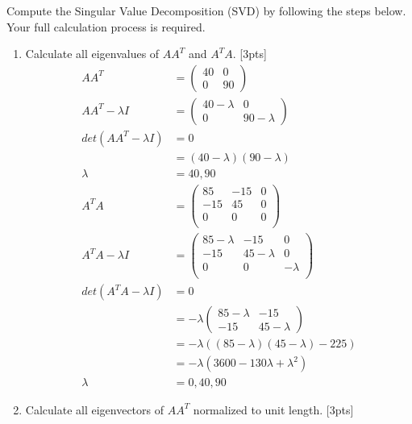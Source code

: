 \documentclass{article}
\begin{document}
\noindent Compute the Singular Value Decomposition (SVD) by following the steps below. Your full calculation process is required.
\begin{enumerate}[label=(\alph*)]
\item Calculate all eigenvalues of $AA^{T}$ and $A^{T}A$. [3pts] \newline \begin{align*}
    AA^T &= \begin{pmatrix}
        40 & 0 \\
        0 & 90
    \end{pmatrix} \\ AA^T-\lambda I&=\begin{pmatrix}
        40-\lambda & 0 \\
        0 & 90 - \lambda
    \end{pmatrix} \\
    det(AA^T-\lambda I)&=0\\ &=(40-\lambda)(90-\lambda) \\
    \lambda &= 40, 90 \\
    A^TA &= \begin{pmatrix}
        85  & -15  &   0 \\
        -15  &  45   &  0 \\
        0   &  0  &   0  \\
    \end{pmatrix} \\ A^TA-\lambda I&=\begin{pmatrix}
        85-\lambda  & -15  &   0 \\
        -15  &  45-\lambda   &  0 \\
        0   &  0  &   -\lambda  \\
    \end{pmatrix} \\ det(A^TA-\lambda I)&=0\\ &=-\lambda\begin{pmatrix}
        85-\lambda  & -15  \\
        -15  &  45-\lambda
    \end{pmatrix} \\
    &=-\lambda((85-\lambda)(45-\lambda)-225) \\
    &=-\lambda(3600-130\lambda+\lambda^2) \\
    \lambda &= 0, 40, 90
\end{align*}
\item Calculate all eigenvectors of $AA^{T}$ normalized to unit length.  [3pts] \newline \begin{align*}

\end{align*}
\end{enumerate}
\end{document}
